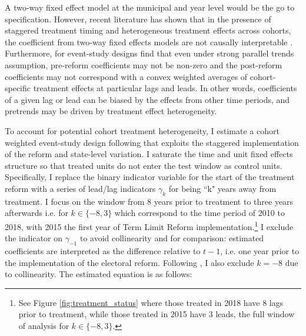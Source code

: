 \documentclass[12pt]{amsart}
\numberwithin{equation}{section}
\theoremstyle{definition}
\theoremstyle{definition}
\theoremstyle{definition}
\begin{document}
A two-way fixed effect model at the municipal and year level would be the go to specification. However, recent literature has shown that in the presence of staggered treatment timing and heterogeneous treatment effects across cohorts, the coefficient from two-way fixed effects models are not causally interpretable \citep{goodman_bacon_2018, callaway_santana_2019, strezhnev_2018, chaisemarting_etal_2019}. Furthermore, for event-study designs \citet{abraham_sun_2020} find that even under strong parallel trends assumption, pre-reform coefficients may not be non-zero and the post-reform coefficients may not correspond with a convex weighted averages of cohort-specific treatment effects at particular lags and leads. In other words, coefficients of a given lag or lead can be biased by the effects from other time periods, and pretrends may be driven by treatment effect heterogeneity.  

 To account for potential cohort treatment heterogeneity, I estimate  a cohort weighted event-study design following \citet{abraham_sun_2020} that exploits the staggered implementation of the reform and state-level variation. I saturate the time and unit fixed effects structure so that treated units do not enter the test window as control units. Specifically, I replace the binary indicator variable for the start of the treatment reform with a series of lead/lag indicators $\gamma_k$ for being ``k" years away from treatment. I focus on the window from 8 years prior to treatment to three years afterwards i.e. for $k \in \{-8,3\} $ which correspond to the time period of 2010 to 2018, with 2015 the first year of Term Limit Reform implementation.\footnote{See Figure \ref{fig:treatment_status} where those treated in 2018 have 8 lags prior to treatment, while those treated in 2015 have 3 leads, the full window of analysis for $k \in \{-8,3\} $.} %
I exclude the indicator on $\gamma_{-1}$ to avoid collinearity and for comparison: estimated coefficients are interpreted as the difference relative to $t-1$, i.e. one year prior to the implementation of the electoral reform. Following   \citet{abraham_sun_2020}, I also exclude $k=-8$ due to collinearity. The estimated equation is as follows:
\end{document}
